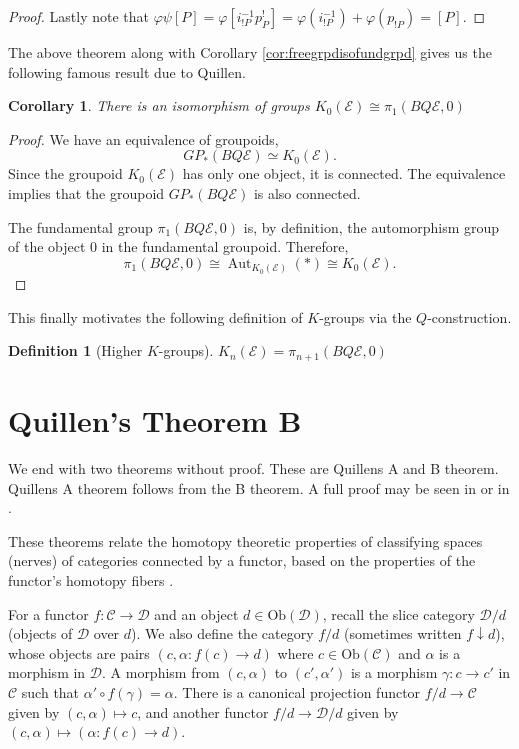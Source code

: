 \documentclass[12pt]{report}
\numberwithin{equation}{section}
\newtheorem{definition}[dummy]{Definition}
\newtheorem{corollary}[dummy]{Corollary}
\begin{document}
\begin{proof}
			
			Lastly note that \( \varphi \psi [P]=\varphi[i^{-1}_{!P} p^!_P]=\varphi(i^{-1}_{!P})+ \varphi(p_{!P})=[P] \). 	
		\end{proof}
		
	
	The above theorem along with Corollary \ref{cor:freegrpdisofundgrpd} gives us the following famous result due to Quillen.
	\begin{corollary}
			There is an isomorphism of groups \( K_0(\mathcal{E}) \cong \pi_1(BQ\mathcal{E},0) \)
	\end{corollary}
	\begin{proof}
		 We have an equivalence of groupoids,
		 \[  GP_*(BQ \mathcal{E}) \simeq K_0(\mathcal{E}). \]
		 Since the groupoid $K_0(\mathcal{E})$ has only one object, it is connected. The equivalence implies that the groupoid $GP_*(BQ\mathcal{E})$ is also connected.
		 
		 The fundamental group $\pi_1(BQ\mathcal{E}, 0)$ is, by definition, the automorphism group of the object $0$ in the fundamental groupoid. Therefore,
		 \[ \pi_1(BQ\mathcal {E}, 0) \cong \operatorname{Aut}_{K_0(\mathcal{E})}(*) \cong K_0(\mathcal{E}). \]
	\end{proof}
	
	This finally motivates the following definition of \( K \)-groups via the \( Q \)-construction.
	\begin{definition}[Higher $K$-groups]
		\(K_n(\mathcal{E})= \pi_{n+1}(BQ\mathcal{E},0)\)
	\end{definition}
	
	\section{Quillen's Theorem B}
	We end with two theorems without proof. These are Quillens A and B theorem. Quillens A theorem follows from the B theorem. A full proof may be seen in \cite{quillenhigherktheoryI} or in \cite{Goerss_Jardine_2009}.	

	
	These theorems relate the homotopy theoretic properties of classifying spaces (nerves) of categories connected by a functor, based on the properties of the functor's homotopy fibers .

	
	For a functor $f: \mathcal{C} \to \mathcal{D}$ and an object $d \in \mathrm{Ob}(\mathcal{D})$, recall the slice category $\mathcal{D}/d$ (objects of $\mathcal{D}$ over $d$). We also define the category $f/d$ (sometimes written $f \downarrow d$), whose objects are pairs $(c, \alpha: f(c) \to d)$ where $c \in \mathrm{Ob}(\mathcal{C})$ and $\alpha$ is a morphism in $\mathcal{D}$. A morphism from $(c, \alpha)$ to $(c', \alpha')$ is a morphism $\gamma: c \to c'$ in $\mathcal{C}$ such that $\alpha' \circ f(\gamma) = \alpha$. There is a canonical projection functor $f/d \to \mathcal{C}$ given by $(c, \alpha) \mapsto c$, and another functor $f/d \to \mathcal{D}/d$ given by $(c, \alpha) \mapsto (\alpha: f(c) \to d)$.
	
\end{document}
